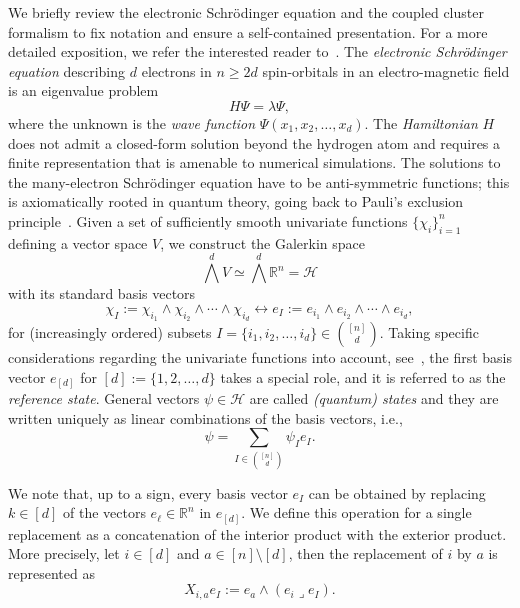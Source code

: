 \documentclass[11pt,reqno]{amsart}
\theoremstyle{definition}
\numberwithin{theorem}{section}
\numberwithin{equation}{section}
\begin{document}
We briefly review the electronic Schrödinger equation and the coupled cluster formalism to fix notation and ensure a self-contained presentation. For a more detailed exposition, we refer the interested reader to~\cite{helgaker2014molecular}. 
The {\em electronic Schrödinger equation} describing $d$ electrons in $n \geq 2d$ spin-orbitals in an electro-magnetic field is an eigenvalue problem~\cite{schrodinger1926undulatory}
\begin{equation} 
\label{eq:schroedinger}
H \Psi
=
\lambda \Psi,
\end{equation}
where the unknown is the {\em wave function} $\Psi(x_1,x_2,\ldots,x_d)$. 
The \emph{Hamiltonian} $H$ does not admit a closed-form solution beyond the hydrogen atom and requires a finite representation that is amenable to numerical simulations. The solutions to the many-electron Schrödinger equation have to be anti-symmetric functions; this is axiomatically rooted in quantum theory, going back to Pauli's exclusion principle~\cite{pauli1925zusammenhang}. Given a set of sufficiently smooth univariate functions $\{\chi_i\}_{i=1}^n$ defining a vector space $V$, we construct the Galerkin space 
%
\begin{equation*}
\bigwedge^dV\simeq \bigwedge^d \mathbb{R}^n = \mathcal{H} 
\end{equation*}
%
with its standard basis vectors 
%
\begin{equation*}
\chi_I
:=
\chi_{i_1} \wedge \chi_{i_2} \wedge  \cdots \wedge \chi_{i_d}
\leftrightarrow
e_I := e_{i_1} \wedge e_{i_2} \wedge  \cdots \wedge e_{i_d},
\end{equation*} 
%
for (increasingly ordered) subsets $I = \{i_1,i_2,\ldots,i_d\} \in \binom{[n]}{d}$. Taking specific considerations regarding the univariate functions into account, see~\cite[Section 4]{faulstich2024algebraic}, the first basis vector $e_{[d]}$ for $[d] := \{1,2,\ldots,d\}$ takes a special role, and it is referred to as the {\em reference state}. General vectors $\psi \in \mathcal{H}$ are called {\em (quantum) states} and they are written uniquely as linear combinations of the basis vectors, i.e., 
%
\begin{equation}\label{eq: quantum states}
\psi 
= 
\sum_{I \in \binom{[n]}{d}} \psi_I  e_I.
\end{equation}



%
\noindent We note that, up to a sign, every basis vector $e_I$ can be obtained by replacing $k\in [d]$ of the vectors $e_{\ell}\in\mathbb{R}^n$ in $e_{[d]}$. We define this operation for a single replacement as a concatenation of the interior product with the exterior product. More precisely, let $i \in [d]$ and $a \in [n] \setminus [d]$, then the replacement of $i$ by $a$ is represented as
\begin{equation}\label{eq: def of X_ij}
X_{i,a} e_I :=  e_a \wedge (e_i \lrcorner e_I).
\end{equation}
\end{document}
